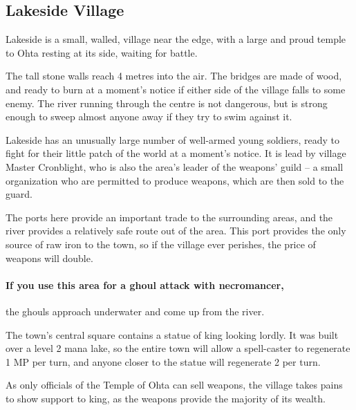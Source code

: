 \subsection{Lakeside Village}
\label{lakeside}


Lakeside is a small, walled, village near the \gls{edge}, with a large and proud temple to Ohta resting at its side, waiting for battle.

The tall stone walls reach 4 metres into the air.
The bridges are made of wood, and ready to burn at a moment's notice if either side of the village falls to some enemy.
The river running through the centre is not dangerous, but is strong enough to sweep almost anyone away if they try to swim against it.

Lakeside has an unusually large number of well-armed young soldiers, ready to fight for their little patch of the world at a moment's notice.
It is lead by \Gls{village} Master Cronblight, who is also the area's leader of the weapons' guild -- a small organization who are permitted to produce weapons, which are then sold to the \gls{guard}.

The ports here provide an important trade to the surrounding areas, and the river provides a relatively safe route out of the area.
This port provides the only  source of raw iron to the town, so if the village ever perishes, the price of weapons will double.

\paragraph{If you use this area for a ghoul attack with \gls{necromancer},}
the ghouls approach underwater and come up from the river.


The town's central square contains a statue of \gls{king} looking lordly.
It was built over a level 2 mana lake, so the entire town will allow a spell-caster to regenerate 1 MP per turn, and anyone closer to the statue will regenerate 2 per turn.

As only officials of the Temple of Ohta can sell weapons, the village takes pains to show support to \gls{king}, as the weapons provide the majority of its wealth.


